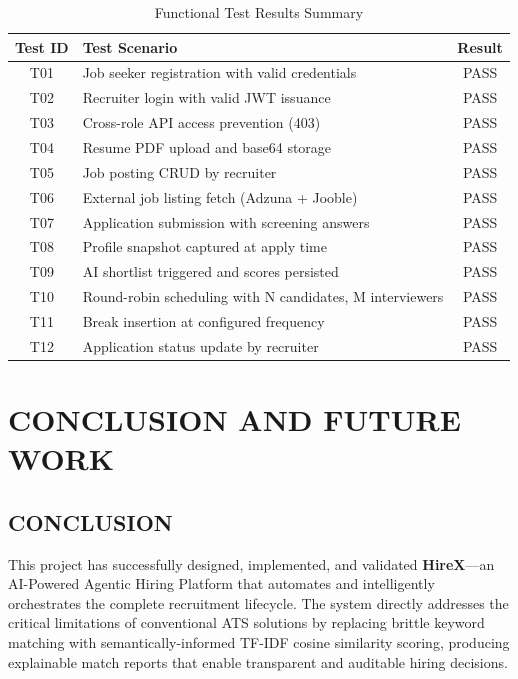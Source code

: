\documentclass[12pt,a4paper]{report}
\begin{document}
\begin{table}[H]
    \centering
    \caption{Functional Test Results Summary}
    \label{tab:testresults}
    \begin{tabular}{|c|l|c|}
        \hline
        \textbf{Test ID} & \textbf{Test Scenario} & \textbf{Result} \\
        \hline
        T01 & Job seeker registration with valid credentials & PASS \\
        T02 & Recruiter login with valid JWT issuance & PASS \\
        T03 & Cross-role API access prevention (403) & PASS \\
        T04 & Resume PDF upload and base64 storage & PASS \\
        T05 & Job posting CRUD by recruiter & PASS \\
        T06 & External job listing fetch (Adzuna + Jooble) & PASS \\
        T07 & Application submission with screening answers & PASS \\
        T08 & Profile snapshot captured at apply time & PASS \\
        T09 & AI shortlist triggered and scores persisted & PASS \\
        T10 & Round-robin scheduling with N candidates, M interviewers & PASS \\
        T11 & Break insertion at configured frequency & PASS \\
        T12 & Application status update by recruiter & PASS \\
        \hline
    \end{tabular}
\end{table}

\chapter{CONCLUSION AND FUTURE WORK}

\section{CONCLUSION}

This project has successfully designed, implemented, and validated \textbf{HireX}---an AI-Powered Agentic Hiring Platform that automates and intelligently orchestrates the complete recruitment lifecycle. The system directly addresses the critical limitations of conventional ATS solutions by replacing brittle keyword matching with semantically-informed TF-IDF cosine similarity scoring, producing explainable match reports that enable transparent and auditable hiring decisions.
\end{document}
